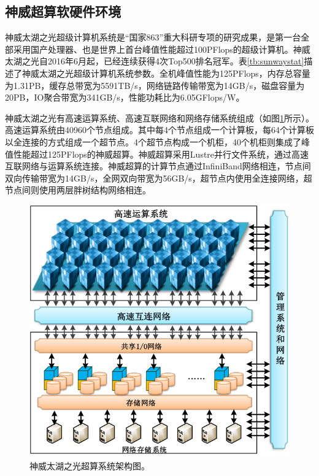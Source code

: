\documentclass[degree=doctor]{thuthesis}
\begin{document}
\subsection{神威超算软硬件环境}
\label{sub:神威超算软硬件环境}
神威太湖之光超级计算机系统是“国家863”重大科研专项的研究成果，是第一台全部采用国产处理器、也是世界上首台峰值性能超过100PFlops的超级计算机。神威太湖之光自2016年6月起，已经连续获得4次Top500排名冠军。表\ref{tb:sunwaystat}描述了神威太湖之光超级计算机系统参数。全机峰值性能为125PFlops，内存总容量为1.31PB，缓存总带宽为5591TB/s，网络链路传输带宽为14GB/s，磁盘容量为20PB，IO聚合带宽为341GB/s，性能功耗比为6.05GFlops/W。


\begin{table}[h]
\centering
\caption{神威太湖之光超级计算机系统基础参数。}
\label{tb:sunwaystat}
\end{table}

神威太湖之光有高速运算系统、高速互联网络和网络存储系统组成（如图\ref{fig:sunwayarch}所示）。高速运算系统由40960个节点组成。其中每4个节点组成一个计算板，每64个计算板以全连接的方式组成一个超节点。4个超节点构成一个机柜，40个机柜则集成了峰值性能超过125PFlops的神威超算。神威超算采用Lustre并行文件系统，通过高速互联网络与运算系统连接。神威超算的计算节点通过InfiniBand网络相连，节点间双向传输带宽为14GB/s，全网双向带宽为56GB/s，超节点内使用全连接网络，超节点间则使用两层胖树结构网络相连。

\begin{figure}[ht]
\centering
\includegraphics[width=.8\columnwidth]{神威系统.png}
\caption{神威太湖之光超算系统架构图。}
\label{fig:sunwayarch}
\end{figure}
\end{document}
